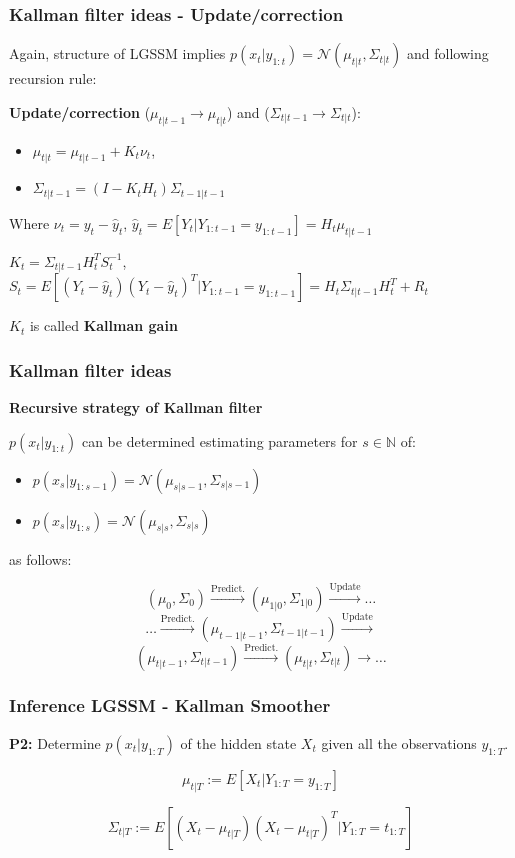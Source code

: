 \documentclass[xcolor=dvipsnames, compress]{beamer}
\newcommand{\N}{\ensuremath{\mathbb{N}}}
\begin{document}
\begin{frame}
\frametitle{Kallman filter ideas - Update/correction} 
Again, structure of LGSSM implies $p(x_t| y_{1:t})=\mathcal{N}( \mu_{t|t}, \Sigma_{t|t})$ and following recursion rule: \vspace{0.5cm}

\textbf{Update/correction} ($\mu_{t|t-1} \rightarrow \mu_{t|t} $) and ($\Sigma_{t|t-1} \rightarrow \Sigma_{t|t} $):
\begin{itemize}
	\item $\mu_{t|t} = \mu_{t|t-1} + K_{t} \nu_{t}$, 
	\item$\Sigma_{t|t-1} = (I-K_t H_t) \Sigma_{t-1|t-1}$
\end{itemize}

Where $\nu_t = y_t - \hat{y}_t$, $\hat{y}_t=E[Y_t|Y_{1:t-1}=y_{1:t-1}]=H_t\mu_{t|t-1}$ 

$K_t=\Sigma_{t|t-1}H_t^T S_t^{-1}$, $S_t=E[(Y_t - \hat{y}_t)(Y_t - \hat{y}_t)^T | Y_{1:t-1} = y_{1:t-1} ] = H_t\Sigma_{t|t-1}H_t^T +R_t$

$K_t$ is called \textbf{Kallman gain}
\end{frame}

\begin{frame}
\frametitle{Kallman filter ideas} 

\textbf{Recursive strategy of Kallman filter}

$p(x_t|y_{1:t})$ can be determined estimating parameters for $s\in \N$ of:
\begin{itemize}
\item $p(x_s| y_{1:s-1})=\mathcal{N}( \mu_{s|s-1}, \Sigma_{s|s-1})$
\item $p(x_s| y_{1:s})=\mathcal{N}( \mu_{s|s}, \Sigma_{s|s})$
\end{itemize}

as follows:

$$(\mu_0, \Sigma_0) \xrightarrow[]{\text{Predict.}} (\mu_{1|0}, \Sigma_{1|0}) \xrightarrow[]{\text{Update}} \ldots $$ 
$$\ldots \xrightarrow[]{\text{Predict.}} (\mu_{t-1|t-1}, \Sigma_{t-1|t-1})\xrightarrow[]{\text{Update}}$$ 
$$(\mu_{t|t-1}, \Sigma_{t|t-1}) \xrightarrow[]{\text{Predict.}} (\mu_{t|t}, \Sigma_{t|t}) \xrightarrow[]{\text{}} \ldots $$

\end{frame}

\begin{frame}
\frametitle{Inference LGSSM - Kallman Smoother}

 \textbf{P2:} Determine $p(x_t|y_{1:T})$ of the hidden state $X_t$ given all the observations $y_{1:T}$. 

\begin{equation}
\mu_{t|T}:= E[X_t | Y_{1:T} = y_{1:T} ]
\end{equation}

\begin{equation}
\Sigma_{t|T}:= E[(X_t -\mu_{t|T}) (X_t -\mu_{t|T})^T | Y_{1:T} = t_{1:T} ]
\end{equation}

\end{frame}
\end{document}
